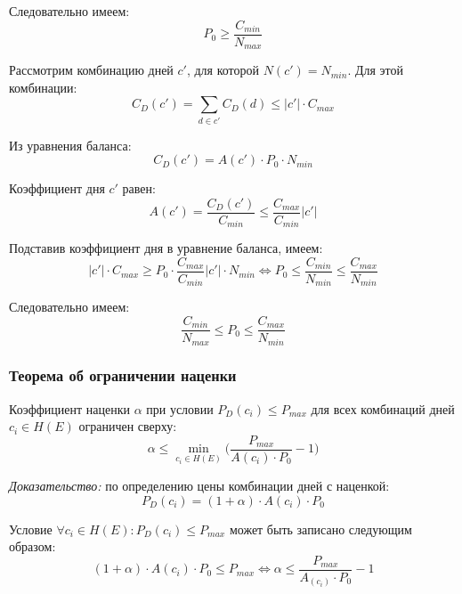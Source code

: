 Следовательно имеем:
\begin{equation}
	P_0 \ge \frac{C_{min}}{N_{max}}
\end{equation}

Рассмотрим комбинацию дней $c'$, для которой $N(c') = N_{min}$. Для этой комбинации:
\begin{equation}
	C_D(c') = \sum_{d \in c'}{C_D(d)} \le |c'| \cdot C_{max}
\end{equation}

Из уравнения баланса:
\begin{equation}
	C_D(c') = A(c') \cdot P_0 \cdot N_{min}
\end{equation}

Коэффициент дня $c'$ равен:
\begin{equation}
	A(c') = \frac{C_D(c')}{C_{min}} \le \frac{C_{max}}{C_{min}}|c'|
\end{equation}

Подставив коэффициент дня в уравнение баланса, имеем:
\begin{equation}
	|c'| \cdot C_{max} \ge P_0 \cdot \frac{C_{max}}{C_{min}}|c'| \cdot N_{min} \Leftrightarrow P_0 \le \frac{C_{min}}{N_{min}} \le \frac{C_{max}}{N_{min}}
\end{equation}

Следовательно имеем:
\begin{equation}
	\frac{C_{min}}{N_{max}} \le P_0 \le \frac{C_{max}}{N_{min}}
\end{equation}

\subsubsection{Теорема об ограничении наценки}

Коэффициент наценки $\alpha$ при условии $P_D(c_i) \le P_{max}$ для всех комбинаций дней $c_i \in H(E)$ ограничен сверху:
\begin{equation}
	\alpha \le \min_{c_i \in H(E)}{\Big(\frac{P_{max}}{A(c_i) \cdot P_0} - 1\Big)}
\end{equation}

\textit{Доказательство:} по определению цены комбинации дней с наценкой:
\begin{equation}
	P_D(c_i) = (1 + \alpha) \cdot A(c_i) \cdot P_0
\end{equation}

Условие $\forall c_i \in H(E): P_D(c_i) \le P_{max}$ может быть записано следующим образом:
\begin{equation}
	(1 + \alpha) \cdot A(c_i) \cdot P_0 \le P_{max} \Leftrightarrow \alpha \le \frac{P_{max}}{A_(c_i) \cdot P_0} - 1
\end{equation}

